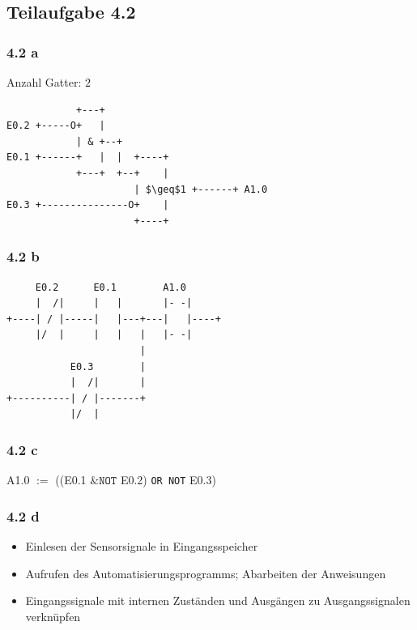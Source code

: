\documentclass[a4paper]{scrartcl}
\begin{document}
  \subsection*{Teilaufgabe 4.2}
  \subsubsection*{4.2 a}
  Anzahl Gatter: $2$
  \begin{lstlisting}
            +---+
E0.2 +-----O+   |
            | & +--+
E0.1 +------+   |  |  +----+
            +---+  +--+    |
                      | $\geq$1 +------+ A1.0
E0.3 +---------------O+    |
                      +----+
  \end{lstlisting}

  \subsubsection*{4.2 b}
  \begin{lstlisting}
     E0.2      E0.1        A1.0
     |  /|     |   |       |- -|
+----| / |-----|   |---+---|   |----+
     |/  |     |   |   |   |- -|
                       |
           E0.3        |
           |  /|       |
+----------| / |-------+
           |/  |
  \end{lstlisting}
  \subsubsection*{4.2 c}
  A1.0 $:=$ ((E0.1 $\&\texttt{NOT}$ E0.2)  \texttt{OR NOT} E0.3)

  \subsubsection*{4.2 d}
  \begin{itemize}
	\item Einlesen der Sensorsignale in Eingangsspeicher
	\item Aufrufen des Automatisierungsprogramms; Abarbeiten der Anweisungen
	\item Eingangssignale mit internen Zuständen und Ausgängen zu Ausgangssignalen verknüpfen
  \end{itemize}
\end{document}
